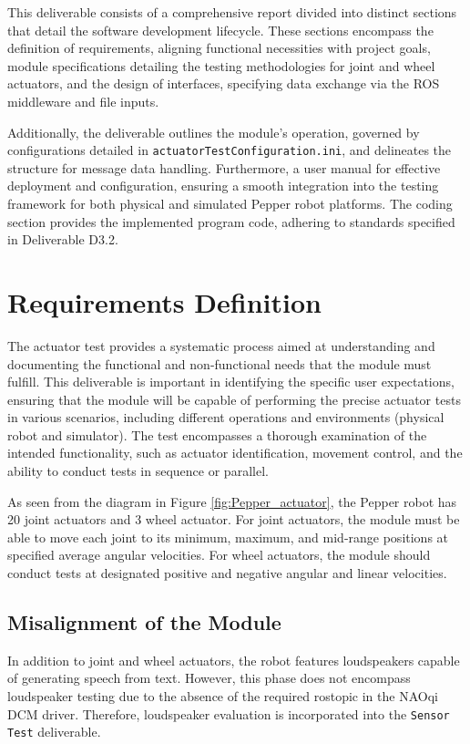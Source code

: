 \documentclass{CSSRforAfrica}
\begin{document}
This deliverable consists of a comprehensive report divided into distinct sections that detail the software development lifecycle. These 
sections encompass the definition of requirements, aligning functional necessities with project goals, module specifications detailing the 
testing methodologies for joint and wheel actuators, and the design of interfaces, specifying data exchange via the ROS middleware and file inputs.

Additionally, the deliverable outlines the module's operation, governed by configurations detailed in \texttt{actuatorTestConfiguration.ini}, and 
delineates the structure for message data handling. Furthermore, a user manual for effective deployment and configuration, ensuring a smooth integration 
into the testing framework for both physical and simulated Pepper robot platforms. The coding section provides the implemented program code, adhering 
to standards specified in Deliverable D3.2. 

\newpage

\section{Requirements Definition}
The actuator test provides a systematic process aimed at understanding and documenting the functional and non-functional
needs that the module must fulfill. This deliverable is important in identifying the specific user expectations, 
ensuring that the module will be capable of performing the precise actuator tests in various scenarios, including different
operations and environments (physical robot and simulator). The test encompasses a thorough examination of the intended 
functionality, such as actuator identification, movement control, and the ability to conduct tests in sequence or parallel.

As seen from the diagram in Figure \ref{fig:Pepper_actuator}, the Pepper robot has 20 joint actuators and 3 wheel actuator.
For joint actuators, the module must be able to move each joint to its minimum, maximum, and mid-range positions at specified 
average angular velocities. For wheel actuators, the module should conduct tests at designated positive and negative angular 
and linear velocities.

\subsection*{Misalignment of the Module}
In addition to joint and wheel actuators, the robot features loudspeakers capable of generating speech from text. However, 
this phase does not encompass loudspeaker testing due to the absence of the required rostopic in the NAOqi DCM driver. 
Therefore, loudspeaker evaluation is incorporated into the \texttt{Sensor Test} deliverable.
\end{document}
